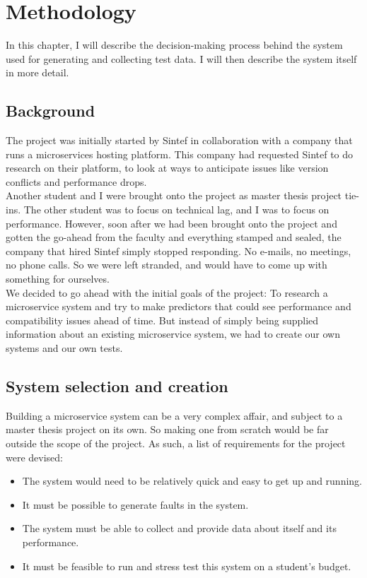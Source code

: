 \chapter{Methodology}

In this chapter, I will describe the decision-making process behind the system used for generating and collecting test data. I will then describe the system itself in more detail.

\section{Background}
The project was initially started by Sintef in collaboration with a company that runs a microservices hosting platform. This company had requested Sintef to do research on their platform, to look at ways to anticipate issues like version conflicts and performance drops. \\
Another student and I were brought onto the project as master thesis project tie-ins. The other student was to focus on technical lag, and I was to focus on performance. However, soon after we had been brought onto the project and gotten the go-ahead from the faculty and everything stamped and sealed, the company that hired Sintef simply stopped responding. No e-mails, no meetings, no phone calls. So we were left stranded, and would have to come up with something for ourselves. \\
We decided to go ahead with the initial goals of the project: To research a microservice system and try to make predictors that could see performance and compatibility issues ahead of time. 
But instead of simply being supplied information about an existing microservice system, we had to create our own systems and our own tests. 

\section{System selection and creation}
Building a microservice system can be a very complex affair, and subject to a master thesis project on its own. So making one from scratch would be far outside the scope of the project. As such, a list of requirements for the project were devised:

\begin{itemize}
    \item The system would need to be relatively quick and easy to get up and running.
    \item It must be possible to generate faults in the system.
    \item The system must be able to collect and provide data about itself and its performance. 
    \item It must be feasible to run and stress test this system on a student's budget.
\end{itemize}

